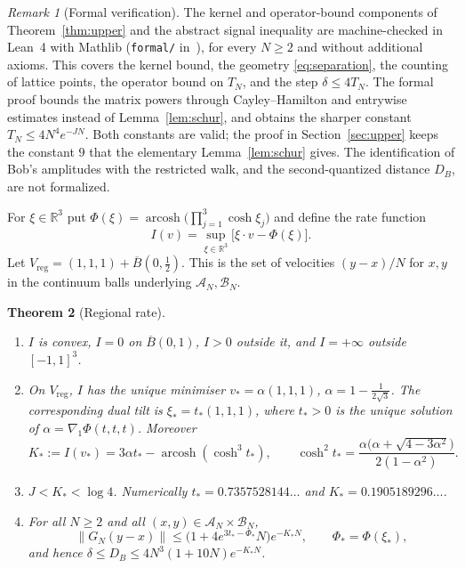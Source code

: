\documentclass[11pt]{amsart}
\newtheorem{theorem}{Theorem}[section]
\theoremstyle{definition}
\theoremstyle{remark}
\newtheorem{remark}[theorem]{Remark}
\newcommand{\R}{\mathbb{R}}
\newcommand{\cA}{\mathcal{A}}
\newcommand{\cB}{\mathcal{B}}
\newcommand{\arcosh}{\operatorname{arcosh}}
\begin{document}
\begin{remark}[Formal verification]
The kernel and operator-bound components of Theorem~\ref{thm:upper}
and the abstract signal inequality are machine-checked in Lean~4 with Mathlib
(\texttt{formal/} in~\cite{Repo}), for every $N\ge2$ and without
additional axioms.  This covers the kernel bound, the geometry
\eqref{eq:separation}, the counting of lattice points, the operator bound on
$T_N$, and the step $\delta\le4T_N$.  The formal proof bounds the matrix
powers through Cayley--Hamilton and entrywise estimates instead of
Lemma~\ref{lem:schur}, and obtains the sharper constant
$T_N\le4N^4e^{-JN}$.  Both constants are valid; the proof in
Section~\ref{sec:upper} keeps the constant $9$ that the elementary
Lemma~\ref{lem:schur} gives.  The identification of Bob's amplitudes with the
restricted walk, and the second-quantized distance $D_B$, are not
formalized.
\end{remark}

For $\xi\in\R^3$ put $\Phi(\xi)=\arcosh\bigl(\prod_{j=1}^3\cosh\xi_j\bigr)$
and define the rate function
\begin{equation}\label{eq:rate}
I(v)=\sup_{\xi\in\R^3}\bigl[\xi\cdot v-\Phi(\xi)\bigr].
\end{equation}
Let $V_{\mathrm{reg}}=(1,1,1)+\overline B(0,\tfrac12)$.  This is the set of
velocities $(y-x)/N$ for $x,y$ in the continuum balls underlying
$\cA_N,\cB_N$.

\begin{theorem}[Regional rate]\label{thm:rate}
\begin{enumerate}[label=(\alph*)]
\item $I$ is convex, $I=0$ on $\overline B(0,1)$, $I>0$ outside it, and
  $I=+\infty$ outside $[-1,1]^3$.
\item On $V_{\mathrm{reg}}$, $I$ has the unique minimiser
  $v_*=\alpha(1,1,1)$, $\alpha=1-\frac1{2\sqrt3}$.  The corresponding dual
  tilt is $\xi_*=t_*(1,1,1)$, where $t_*>0$ is the unique solution of
  $\alpha=\nabla_1\Phi(t,t,t)$.  Moreover
  \[
  K_*:=I(v_*)=3\alpha t_*-\arcosh(\cosh^3t_*),\qquad
  \cosh^2t_*=\frac{\alpha\bigl(\alpha+\sqrt{4-3\alpha^2}\bigr)}{2(1-\alpha^2)} .
  \]
\item $J<K_*<\log4$.  Numerically $t_*=0.7357528144\ldots$ and
  $K_*=0.1905189296\ldots$.
\item For all $N\ge2$ and all $(x,y)\in\cA_N\times\cB_N$,
  \[
  \|G_N(y-x)\|\le\bigl(1+4e^{3t_*-\Phi_*}N\bigr)e^{-K_*N},\qquad \Phi_*=\Phi(\xi_*),
  \]
  and hence $\delta\le D_B\le4N^3(1+10N)e^{-K_*N}$.
\end{enumerate}
\end{theorem}
\end{document}
